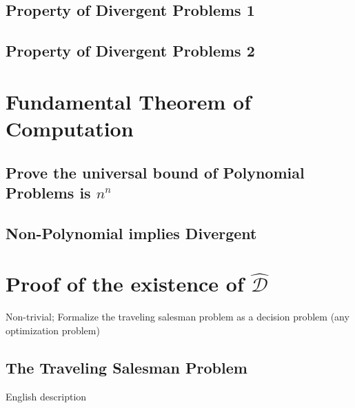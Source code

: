 \documentclass[11pt]{article}
\begin{document}
\subsection{Property of Divergent Problems 1}
\subsection{Property of Divergent Problems 2}












\section{Fundamental Theorem of Computation}
\subsection{Prove the universal bound of Polynomial Problems is $n^n$}
\subsection{Non-Polynomial implies Divergent}




















\newpage
\section{Proof of the existence of $\hat{\mathcal{D}}$}
Non-trivial; Formalize the traveling salesman problem as a decision problem (any optimization problem)

\subsection{The Traveling Salesman Problem}
English description
\end{document}
